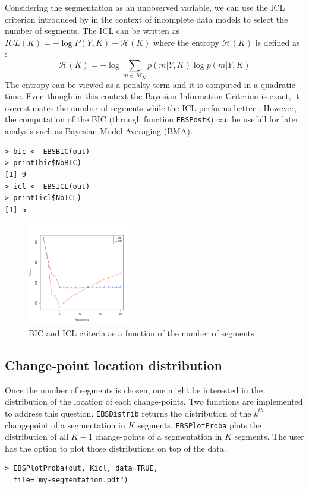 \documentclass{bioinfo}
\begin{document}
\begin{methods}
Considering the segmentation as an unobserved variable, we can use the ICL criterion introduced by \cite{biernacki_assessingmixture_2000} in the context of incomplete data models to select the number of segments. 
The ICL can be written as $ICL(K) = -\log P(Y,K) + \mathcal{H}(K) \label{ICL}$ where
the entropy $\mathcal{H}(K)$ is defined as :
\begin{equation}
  \mathcal{H}(K)=-\log \sum_{m\in \mathcal{M}_K} p(m|Y,K) \log p(m|Y,K)
\end{equation}
The entropy can be viewed as a penalty term and it is computed in a quadratic time. 
 Even though in this context the Bayesian Information Criterion is exact, it overestimates the number of segments while the ICL performs better \citep{rigaill_exact_2011}. However, the computation of the BIC (through function \texttt{EBSPostK}) can be usefull for later analysis such as Bayesian Model Averaging (BMA).
\begin{verbatim}
> bic <- EBSBIC(out)
> print(bic$NbBIC)
[1] 9
> icl <- EBSICL(out)
> print(icl$NbICL)
[1] 5

\end{verbatim}


\begin{figure}[!h]%
\centerline{\includegraphics[width=4.5cm]{icl-bic.pdf}}
\caption{BIC and ICL criteria as a function of the number of segments} \label{fig:01}
\end{figure}






\subsection{Change-point location distribution}

Once the number of segments is chosen, one might be interested in the distribution of the location of each change-points. Two functions are implemented to address this question. \texttt{EBSDistrib} returns the distribution of the $k^{th}$ changepoint of a segmentation in $K$ segments. \texttt{EBSPlotProba} plots the distribution of all $K\!-\!1$ change-points of a segmentation in $K$ segments. The user has the option to plot those distributions on top of the data. 
\begin{verbatim}
> EBSPlotProba(out, Kicl, data=TRUE,
  file="my-segmentation.pdf")
\end{verbatim}


\end{methods}
\end{document}
